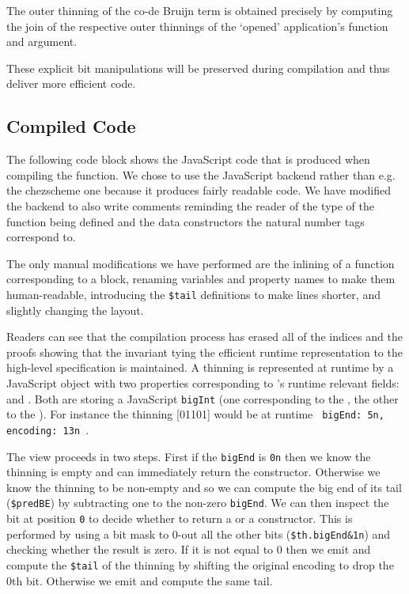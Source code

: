 The outer thinning of the co-de Bruijn term is obtained precisely by
computing the join of the respective outer thinnings of the `opened'
application's function and argument.

These explicit bit manipulations will be preserved during compilation and
thus deliver more efficient code.


\subsection{Compiled Code}\label{sec:compiledview}

The following code block shows the JavaScript code that is produced when compiling the
 function. We chose to use the JavaScript backend rather than e.g.
the chezscheme one because it produces fairly readable code.
%
We have modified the backend to also write comments reminding the reader of the type
of the function being defined and the data constructors the natural number tags
correspond to.

The only manual modifications we have performed are the inlining of a function
corresponding to a  block, renaming variables and property names
to make them human-readable, introducing the \texttt{\$tail} definitions to make
lines shorter, and slightly changing the layout.



Readers can see that the compilation process has erased all of the indices
and the proofs
showing that the invariant tying the efficient runtime representation to the
high-level specification is maintained.
%
A thinning is represented at runtime by a JavaScript object with two properties
corresponding to 's runtime relevant fields: 
and .
%
Both are storing a JavaScript \texttt{bigInt} (one corresponding to the
, the other to the ).
%
For instance the thinning [01101] would be at runtime
\texttt{{ bigEnd: 5n, encoding: 13n }}.
%

The view proceeds in two steps. First if the \texttt{bigEnd} is \texttt{0n}
then we know the thinning is empty and can immediately return the 
constructor.
%
Otherwise we know the thinning to be non-empty and so we can compute the big end
of its tail (\texttt{\$predBE}) by subtracting one to the non-zero \texttt{bigEnd}.
We can then inspect the bit at position \texttt{0} to decide whether to return a
 or a  constructor. This is performed by using a
bit mask to 0-out all the other bits (\texttt{\$th.bigEnd\&1n}) and checking whether
the result is zero.
%
If it is not equal to 0 then we emit  and compute the \texttt{\$tail}
of the thinning by shifting the original encoding to drop the 0th bit. Otherwise we
emit  and compute the same tail.

